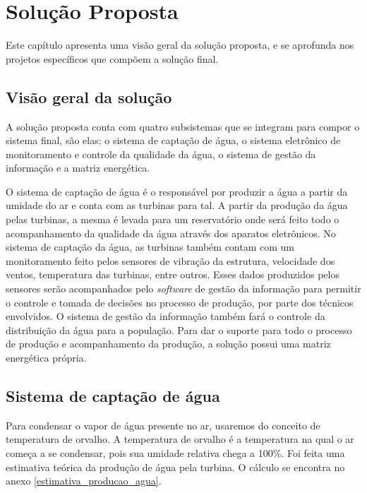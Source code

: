 \chapter{Solução Proposta}

  Este capítulo apresenta uma visão geral da solução proposta, e se aprofunda nos projetos específicos que 
  compõem a solução final.
  
  \section{Visão geral da solução}
    
    A solução proposta conta com quatro subsistemas que se integram para compor o sistema final, são elas: 
    o sistema de captação de água, o sistema eletrônico de monitoramento e controle da qualidade da água, o sistema de 
    gestão da informação e a matriz energética.
    
    O sistema de captação de água é o responsável por produzir a água a partir da umidade do ar e conta com as turbinas para tal.
    A partir da produção da água pelas turbinas, a mesma é levada para um reservatório onde será feito todo o acompanhamento da
    qualidade da água através dos aparatos eletrônicos. No sistema de captação da água, as turbinas também contam com um monitoramento 
    feito pelos sensores de vibração da estrutura, velocidade dos ventos, temperatura das turbinas, entre outros.
    Esses dados produzidos pelos sensores serão acompanhados pelo \textit{software} de gestão da informação para permitir o controle e 
    tomada de decisões no processo de produção, por parte dos técnicos envolvidos. O sistema de gestão da informação também fará 
    o controle da distribuição da água para a população. Para dar o suporte para todo o processo de produção e acompanhamento da 
    produção, a solução possui uma matriz energética própria.
    
    

  \section{Sistema de captação de água}
    
      Para condensar o vapor de água presente no ar, usaremos do conceito de temperatura de orvalho. A temperatura de orvalho 
      é a temperatura na qual o ar começa a se condensar, pois sua umidade relativa chega a 100\%. Foi feita uma estimativa
      teórica da produção de água pela turbina. O cálculo se encontra no anexo \ref{estimativa_producao_agua}.
      
